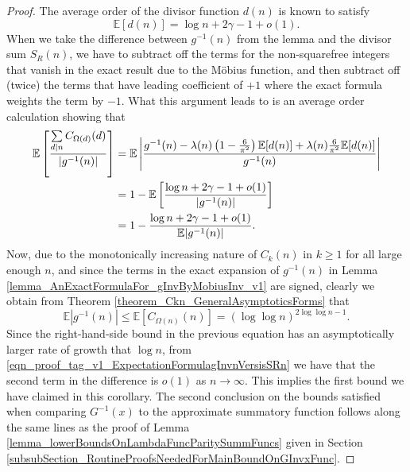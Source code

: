 \documentclass[11pt,reqno,a4letter]{article}
\numberwithin{figure}{section}
\numberwithin{table}{section}
\theoremstyle{plain}
\numberwithin{theorem}{section}
\theoremstyle{definition}
\begin{document}
\begin{proof}
The average order of the divisor function $d(n)$ is known to satisfy \cite[\S 27.11]{NISTHB} 
\[
\mathbb{E}[d(n)] = \log n + 2\gamma-1 + o(1). 
\]
When we take the difference between $g^{-1}(n)$ from the lemma and the divisor sum $S_R(n)$, 
we have to subtract off the terms for the non-squarefree integers that vanish in the exact result 
due to the M\"obius function, and then subtract off (twice) the terms that have leading coefficient of 
$+1$ where the exact formula weights the term by $-1$. What this argument leads to is an average order 
calculation showing that 
\begin{align} 
\notag 
\mathbb{E}\left[\frac{\sum\limits_{d|n} C_{\Omega(d)}(d)}{|g^{-1}(n)|}\right] & = 
     \mathbb{E}\left\lvert \frac{g^{-1}(n) - \lambda(n) \left(1 - \frac{6}{\pi^2}\right) 
     \mathbb{E}[d(n)] + \lambda(n) \frac{6}{\pi^2} \mathbb{E}[d(n)]}{g^{-1}(n)} 
     \right\rvert \\ 
\notag 
     & = 1 - \mathbb{E}\left[\frac{\log n + 2\gamma-1 + o(1)}{|g^{-1}(n)|}\right] \\ 
\label{eqn_proof_tag_v1_ExpectationFormulagInvnVersisSRn} 
     & = 1 - \frac{\log n + 2\gamma-1 + o(1)}{\mathbb{E}|g^{-1}(n)|}. 
\end{align} 
Now, due to the monotonically increasing nature of $C_k(n)$ in $k \geq 1$ for all large enough $n$, 
and since the terms in the exact expansion of $g^{-1}(n)$ in 
Lemma \ref{lemma_AnExactFormulaFor_gInvByMobiusInv_v1} are signed, 
clearly we obtain from Theorem \ref{theorem_Ckn_GeneralAsymptoticsForms} that 
\[
\mathbb{E}|g^{-1}(n)| \leq \mathbb{E}\left[C_{\Omega(n)}(n)\right] = 
     (\log\log n)^{2\log\log n-1}. 
\]
Since the right-hand-side bound in the previous equation has an asymptotically larger rate of 
growth that $\log n$, from \eqref{eqn_proof_tag_v1_ExpectationFormulagInvnVersisSRn} we have that 
the second term in the difference is $o(1)$ as $n \rightarrow \infty$. 
This implies the first bound we have claimed in this corollary. 
The second conclusion on the bounds satisfied when comparing $G^{-1}(x)$ to the approximate 
summatory function follows along the same lines as the proof of 
Lemma \ref{lemma_lowerBoundsOnLambdaFuncParitySummFuncs} 
given in Section \ref{subsubSection_RoutineProofsNeededForMainBoundOnGInvxFunc}. 
\end{proof} 
\end{document}
